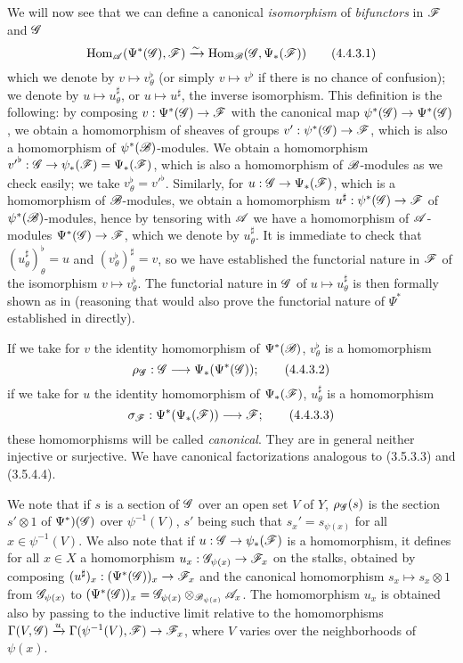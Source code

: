\begin{env}[4.4.3]
\label{0.4.4.3}
We will now see that we can define a canonical \emph{isomorphism} of \emph{bifunctors} in
$\mathscr{F}$ and $\mathscr{G}$
\[
  {\mathop{\mathrm{Hom}}\nolimits}_\mathscr{A}(\Psi^*(\mathscr{G}),\mathscr{F})\xrightarrow{\sim}{\mathop{\mathrm{Hom}}\nolimits}_\mathscr{B}(\mathscr{G},\Psi_*(\mathscr{F}))
  \tag{4.4.3.1}
\]
which we denote by $v\mapsto v_\theta^\flat$ (or simply $v\mapsto v^\flat$ if there is no
chance of confusion); we denote by $u\mapsto u_\theta^\sharp$, or $u\mapsto u^\sharp$, the
inverse isomorphism. This definition is the following: by composing
$v:\Psi^*(\mathscr{G})\to\mathscr{F}$ with the canonical map $\psi^*(\mathscr{G})\to\Psi^*(\mathscr{G})$, we
obtain a homomorphism of sheaves of groups $v':\psi^*(\mathscr{G})\to\mathscr{F}$, which is also a
homomorphism of $\psi^*(\mathscr{B})$-modules. We obtain  a homomorphism
${v'}^\flat:\mathscr{G}\to\psi_*(\mathscr{F})=\Psi_*(\mathscr{F})$, which is also a homomorphism of
$\mathscr{B}$-modules as we
check easily; we take $v_\theta^\flat={v'}^\flat$. Similarly, for
$u:\mathscr{G}\to\Psi_*(\mathscr{F})$, which is a homomorphism of $\mathscr{B}$-modules, we obtain
 a homomorphism $u^\sharp:\psi^*(\mathscr{G})\to\mathscr{F}$ of
$\psi^*(\mathscr{B})$-modules, hence by tensoring with $\mathscr{A}$ we have a homomorphism of
$\mathscr{A}$-modules $\Psi^*(\mathscr{G})\to\mathscr{F}$, which we denote by $u_\theta^\sharp$. It is
immediate to check that $(u_\theta^\sharp)_\theta^\flat=u$ and
$(v_\theta^\flat)_\theta^\sharp=v$, so we have established the functorial nature in $\mathscr{F}$
of the isomorphism $v\mapsto v_\theta^\flat$. The functorial nature in $\mathscr{G}$ of
$u\mapsto u_\theta^\sharp$ is then formally shown as in  (reasoning that
would also prove the functorial nature of $\Psi^*$ established in 
directly).

If we take for $v$ the identity homomorphism of $\Psi^*(\mathscr{B})$, $v_\theta^\flat$ is a
homomorphism
\[
  \rho_\mathscr{G}:\mathscr{G}\longrightarrow\Psi_*(\Psi^*(\mathscr{G}));
  \tag{4.4.3.2}
\]
if we take for $u$ the identity homomorphism of $\Psi_*(\mathscr{F})$, $u_\theta^\sharp$ is a
homomorphism
\[
  \sigma_\mathscr{F}:\Psi^*(\Psi_*(\mathscr{F}))\longrightarrow\mathscr{F};
  \tag{4.4.3.3}
\]
these homomorphisms will be called \emph{canonical}. They are in general neither injective or
surjective. We have canonical factorizations analogous to (3.5.3.3) and (3.5.4.4).

We note that if $s$ is a section of $\mathscr{G}$ over an open set $V$ of $Y$, $\rho_\mathscr{G}(s)$ is
the section $s'\otimes 1$ of $\Psi^*)(\mathscr{G})$ over $\psi^{-1}(V)$, $s'$ being such that
$s_x'=s_{\psi(x)}$ for all $x\in\psi^{-1}(V)$. We also note that if
$u:\mathscr{G}\to\psi_*(\mathscr{F})$ is a homomorphism, it defines for all $x\in X$ a homomorphism
$u_x:\mathscr{G}_{\psi(x)}\to\mathscr{F}_x$ on the stalks, obtained by composing
$(u^\sharp)_x:(\Psi^*(\mathscr{G}))_x\to\mathscr{F}_x$ and the canonical homomorphism
$s_x\mapsto s_x\otimes 1$ from $\mathscr{G}_{\psi(x)}$ to
$(\Psi^*(\mathscr{G}))_x=\mathscr{G}_{\psi(x)}\otimes_{\mathscr{B}_{\psi(x)}}\mathscr{A}_x$. The homomorphism
$u_x$ is obtained also by passing to the inductive limit relative to the homomorphisms
$\Gamma(V,\mathscr{G})\xrightarrow{u}\Gamma(\psi^{-1}(V),\mathscr{F})\to\mathscr{F}_x$, where $V$ varies
over the neighborhoods of $\psi(x)$.
\end{env}

